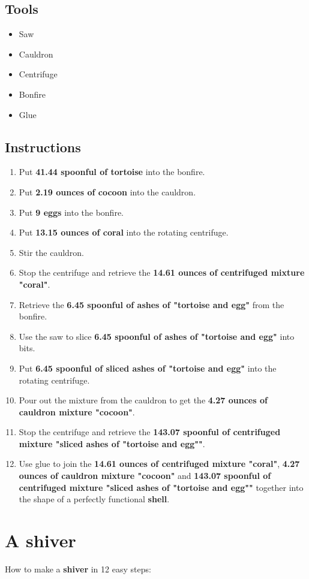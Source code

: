 \documentclass{article}
\begin{document}
\subsection{Tools}\begin{itemize}
\item 
Saw
\item 
Cauldron
\item 
Centrifuge
\item 
Bonfire
\item 
Glue
\end{itemize}
\subsection{Instructions}\begin{enumerate}
\item 
Put \textbf{41.44 spoonful of tortoise} into the bonfire.
\item 
Put \textbf{2.19 ounces of cocoon} into the cauldron.
\item 
Put \textbf{9 eggs} into the bonfire.
\item 
Put \textbf{13.15 ounces of coral} into the rotating centrifuge.
\item 
Stir the cauldron.
\item 
Stop the centrifuge and retrieve the \textbf{14.61 ounces of centrifuged mixture "coral"}.
\item 
Retrieve the \textbf{6.45 spoonful of ashes of "tortoise and egg"} from the bonfire.
\item 
Use the saw to slice \textbf{6.45 spoonful of ashes of "tortoise and egg"} into bits.
\item 
Put \textbf{6.45 spoonful of sliced ashes of "tortoise and egg"} into the rotating centrifuge.
\item 
Pour out the mixture from the cauldron to get the \textbf{4.27 ounces of cauldron mixture "cocoon"}.
\item 
Stop the centrifuge and retrieve the \textbf{143.07 spoonful of centrifuged mixture "sliced ashes of "tortoise and egg""}.
\item 
Use glue to join the \textbf{14.61 ounces of centrifuged mixture "coral"}, \textbf{4.27 ounces of cauldron mixture "cocoon"} and \textbf{143.07 spoonful of centrifuged mixture "sliced ashes of "tortoise and egg""} together into the shape of a perfectly functional \textbf{shell}.
\end{enumerate}
\newpage
\section{A shiver}How to make a \textbf{shiver} in 12 easy steps:
\end{document}
